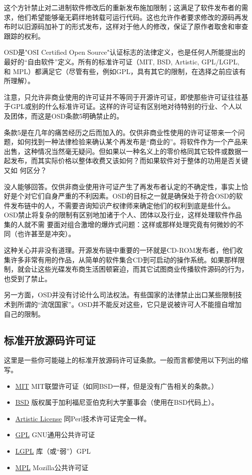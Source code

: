 \documentclass[12pt,oneside]{book}
\begin{document}
\begin{common-format}
这个方针禁止对二进制软件修改后的重新发布施加限制；这满足了软件发布者的需求，他们希望能够毫无羁绊地转载可运行代码。这也允许作者要求修改的源码再发布时以旧源码加补丁的形式发布，这样对于他人的修改，保证了原作者取舍和审查跟踪的权利。

OSD是"OSI Certified Open Source"认证标志的法律定义，也是任何人所能提出的最好的“自由软件”定义。所有的标准许可证（MIT, BSD, Artistic, GPL/LGPL, 和 MPL）都满足它（尽管有些，例如GPL，具有其它的限制，在选择之前应该有所理解）。

注意，只允许非商业使用的许可证并不等同于开源许可证，即使那些许可证往往基于GPL或别的什么标准许可证。这样的许可证有区别地对待特别的行业、个人以及团体，而这是OSD条款5明确禁止的。

条款5是在几年的痛苦经历之后而加入的。仅供非商业性使用的许可证带来一个问题，如何找到一种法律检验来确认某个再发布是“商业的”。将软件作为一个产品来出售，这种情况当然毫无疑问。但如果以一种名义上的零价格同其它较件或数据一起发布，而其实际价格以整体收费又该如何？而如果软件对于整体的功用是否关键又如
何区分？

没人能够回答。仅供非商业使用许可证产生了再发布者认定的不确定性，事实上恰好是个对它们自身严重的不利因素。OSD的目标之一就是确保处于符合OSD的软件发布链中的人，不需要咨询知识产权律师来确定他们的权利到底是些什么。OSD禁止将复杂的限制有区别地加诸于个人、团体以及行业，这样处理软件作品集的人就不需
要面对组合激增的爆炸式问题：这样或那样处理究竟有何微妙的不同（也许甚至是冲突）。

这种关心并非没有道理。开源发布链中重要的一环就是CD-ROM发布者，他们收集许多非常有用的作品，从简单的软件集合CD到可启动的操作系统。如果那样限制，就会让这些光碟发布商生活困顿窘迫，而其它试图商业传播软件源码的行为，也受到了禁止。

另一方面，OSD并没有讨论什么司法权法。有些国家的法律禁止出口某些限制技术到所谓的“流氓国家”。OSD并不能反对这些，它只是说被许可人不能擅自增加自己的限制。

\subsection{标准开放源码许可证}
这里是一些你可能碰上的标准开放源码许可证条款。一般而言都使用以下列出的缩写。
\begin{itemize}
\item \href{http://www.opensource.org/licenses/mit-license.html}{MIT} MIT联盟许可证（如同BSD一样，但是没有广告相关的条款。）
\item \href{http://www.opensource.org/licenses/bsd-license.html}{BSD} 版权属于加利福尼亚伯克利大学董事会（使用在BSD代码上）。
\item \href{http://www.opensource.org/licenses/artistic-license.html}{Artistic License} 同Perl技术许可证完全一样。
\item \href{http://www.gnu.org/copyleft.html}{GPL} GNU通用公共许可证
\item \href{http://www.gnu.org/copyleft.html}{LGPL} 库（或“弱”）GPL
\item \href{http://www.opensource.org/licenses/MPL-1.1.html}{MPL} Mozilla公共许可证
\end{itemize}


\end{common-format}
\end{document}
